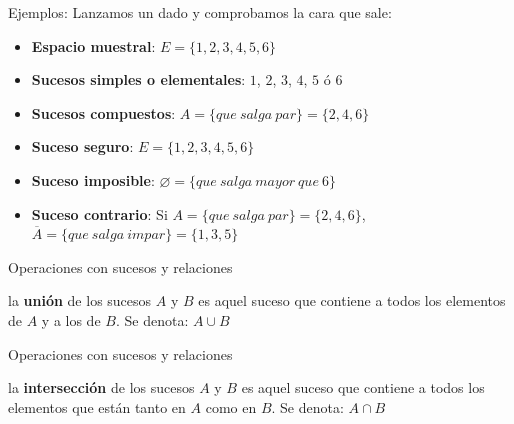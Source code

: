 \documentclass[11pt,handout]{beamer}
\begin{document}
\begin{frame}{Ejemplos:}
Lanzamos un dado y comprobamos la cara que sale:
\begin{itemize}[<+->]
\item \textbf{Espacio muestral}: $E=\lbrace 1,2,3,4,5,6 \rbrace $
\item \textbf{Sucesos simples o elementales}: $1$, $2$, $3$, $4$, $5$ ó $6$
\item \textbf{Sucesos compuestos}: $A=\lbrace que\ salga\ par\rbrace=\lbrace2,4,6\rbrace$
\item \textbf{Suceso seguro}: $E=\lbrace 1,2,3,4,5,6 \rbrace $
\item \textbf{Suceso imposible}: $\varnothing=\lbrace que\ salga \ mayor \ que \ 6\rbrace$
\item \textbf{Suceso contrario}: Si $A=\lbrace que\ salga\ par\rbrace=\lbrace2,4,6\rbrace$, $\overline{A}=\lbrace que\ salga\ impar\rbrace=\lbrace1,3,5\rbrace$ 
\end{itemize}
\end{frame}


\begin{frame}
{Operaciones con sucesos y relaciones}

\begin{block}{}
la \textbf{unión} de los sucesos $A$ y $B$ es aquel suceso que contiene a todos los elementos de $A$ y a  los de $B$. Se denota: $A\cup B$ 
\end{block}


\end{frame}

\begin{frame}
{Operaciones con sucesos y relaciones}

\begin{block}{}
la \textbf{intersección} de los sucesos $A$ y $B$ es aquel suceso que contiene a todos los elementos que están tanto en $A$ como en $B$. Se denota: $A\cap B$ 
\end{block}


\end{frame}
\end{document}

